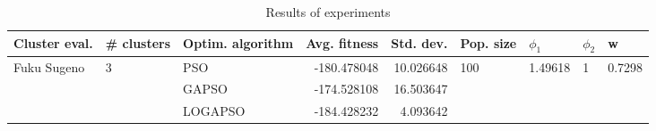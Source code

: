 \begin{table}
\centering
\caption{Results of experiments}
\begin{tabular}{lllrrllll}
\toprule
               Cluster eval. &        \# clusters & Optim. algorithm &  Avg. fitness &  Std. dev. &            Pop. size &               $\phi_{1}$ &         $\phi_{2}$ &                       w \\
\midrule
\multirow{3}{*}{Fuku Sugeno} & \multirow{3}{*}{3} &              PSO &   -180.478048 &  10.026648 & \multirow{3}{*}{100} & \multirow{3}{*}{1.49618} & \multirow{3}{*}{1} & \multirow{3}{*}{0.7298} \\
                             &                    &            GAPSO &   -174.528108 &  16.503647 &                      &                          &                    &                         \\
                             &                    &          LOGAPSO &   -184.428232 &   4.093642 &                      &                          &                    &                         \\
\bottomrule
\end{tabular}
\end{table}
